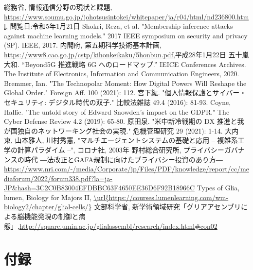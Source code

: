 \begin{thebibliography}{9}
総務省, 情報通信分野の現状と課題, \url{https://www.soumu.go.jp/johotsusintokei/whitepaper/ja/r04/html/nd236800.html}, 閲覧日:令和5年1月21日
Shokri, Reza, et al. "Membership inference attacks against machine learning models." 2017 IEEE symposium on security and privacy (SP). IEEE, 2017.
内閣府, 第五期科学技術基本計画, \url{https://www8.cao.go.jp/cstp/kihonkeikaku/5honbun.pdf},平成28年1月22日
五十嵐大和. ``Beyond5G 推進戦略 6G へのロードマップ.'' IEICE Conferences Archives. The Institute of Electronics, Information and Communication Engineers, 2020. 
Bremmer, Ian. "The Technopolar Moment: How Digital Powers Will Reshape the Global Order." Foreign Aff. 100 (2021): 112.
宮下紘. "個人情報保護とサイバー・セキュリティ: デジタル時代の双子." 比較法雑誌 49.4 (2016): 81-93.
Coyne, Hallie. "The untold story of Edward Snowden’s impact on the GDPR." The Cyber Defense Review 4.2 (2019): 65-80.
原田泉. "米中新冷戦期の DX 推進と我が国独自のネットワーキング社会の実現." 危機管理研究 29 (2021): 1-14.
大内 東, 山本雅人, 川村秀憲, "マルチエージェントシステムの基礎と応用 -- 複雑系工学の計算パラダイム --", コロナ社, 2003年
野村総合研究所, プライバシーガバナンスの時代 ―法改正とGAFA規制に向けたプライバシー投資のあり方― \url{https://www.nri.com/-/media/Corporate/jp/Files/PDF/knowledge/report/cc/mediaforum/2022/forum338.pdf?la=ja-JP&hash=3C2C0B83004EFDBBC63F4650EE36D6F92B18966C}
Types of Glia, lumen, Biology for Majors II,
\url{\url{https://courses.lumenlearning.com/wm-biology2/chapter/glial-cells/}}
文部科学省, 新学術領域研究「グリアアセンブリによる脳機能発現の制御と病態」,\url{http://square.umin.ac.jp/glialassembl/research/index.html#con02}
\end{thebibliography}
\chapter{付録}






